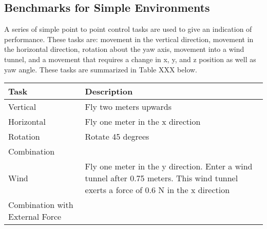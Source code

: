 \documentclass[letterpaper,12pt,titlepage,oneside,final]{book}
\begin{document}
\subsection{Benchmarks for Simple Environments}

A series of simple point to point control tasks are used to give an indication of performance. 
These tasks are: movement in the vertical direction, movement in the horizontal direction, rotation about the yaw axis, movement into a wind tunnel, and a movement that requires a change in x, y, and z position as well as yaw angle. 
These tasks are summarized in Table XXX below.


\begin{center}
\begin{tabular}{| l | p{9cm} |}

\hline
Task & Description \\ \hline
Vertical & Fly two meters upwards \\ \hline
Horizontal & Fly one meter in the x direction \\ \hline
Rotation & Rotate 45 degrees \\ \hline
Combination & \\ \hline
Wind & Fly one meter in the y direction. Enter a wind tunnel after 0.75 meters. This wind tunnel exerts a force of 0.6 N in the x direction \\ \hline
Combination with External Force & \\ \hline

\end{tabular}
\end{center}



\end{document}
